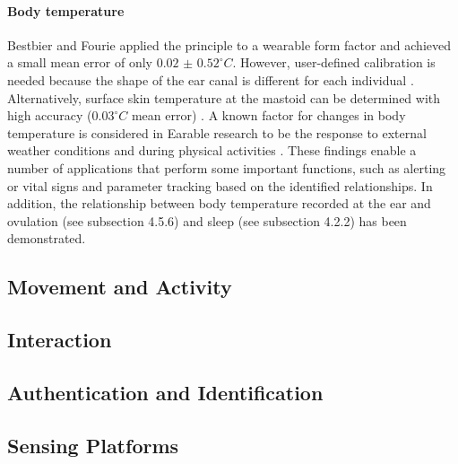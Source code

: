 \paragraph{Body temperature}
\label{Background:SensingWithEarables:Physiological:BodyTemperature}
Bestbier and Fourie \cite{bestbierDevelopmentVitalSigns2018a} applied the principle to a wearable form factor and achieved a small mean error of only $0.02$ $\pm$ $0.52 ^\circ C$. 
However, user-defined calibration is needed because the shape of the ear canal is different for each individual \cite{bestbierDevelopmentVitalSigns2018a, luekenPhotoplethysmographybasedInearSensor2017a, matsumotoEarbudtypeWearableHearable2019a}.
Alternatively, surface skin temperature at the mastoid can be determined with high accuracy ($0.03 ^\circ C$ mean error) \cite{atallahErgonomicWearableCore2018Augmented Hearing Assistance for Elderly People}.
A known factor for changes in body temperature is considered in Earable research to be the response to external weather conditions \cite{barralonAugmentedHearingAssistance2015, boanoNoninvasiveMeasurementCore2013, celikEvaluationBehindtheEarECG2016} and during physical activities \cite{boanoNoninvasiveMeasurementCore2013, 71, celikEvaluationBehindtheEarECG2016, matsumotoEarbudtypeWearableHearable2019a, sugimotoDevelopmentWirelessSensing2011}.
These findings enable a number of applications that perform some important functions, such as alerting or vital signs and parameter tracking based on the identified relationships.
In addition, the relationship between body temperature recorded at the ear and ovulation (see subsection 4.5.6) and sleep (see subsection 4.2.2) has been demonstrated.

\subsection{Movement and Activity}
\label{Background:SensingWithEarables:Movement}

\subsection{Interaction}
\label{Background:SensingWithEarables:Interaction}

\subsection{Authentication and Identification}
\label{Background:SensingWithEarables:Authentication}

\subsection{Sensing Platforms}
\label{Background:SensingWithEarables:SensingPlatforms}




